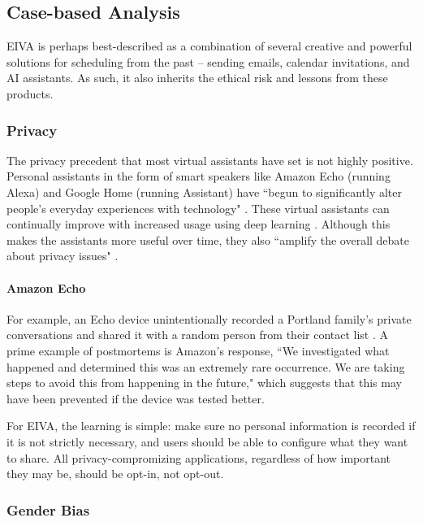 \documentclass{article}
\begin{document}
\subsection{Case-based Analysis}

EIVA is perhaps best-described as a combination of several creative and powerful solutions for scheduling from the past -- sending emails, calendar invitations, and AI assistants. As such, it also inherits the ethical risk and lessons from these products.

\subsubsection{Privacy}

The privacy precedent that most virtual assistants have set is not highly positive. Personal assistants in the form of smart speakers like Amazon Echo (running Alexa) and Google Home (running Assistant) have ``begun to significantly alter people’s everyday experiences with technology" \cite{pridmore_personal_2020}. These virtual assistants can continually improve with increased usage using deep learning \cite{kepuska_next-generation_2018}. Although this makes the assistants more useful over time, they also ``amplify the overall debate about privacy issues" \cite{zeng_end_2017}.

\paragraph{Amazon Echo}

For example, an Echo device unintentionally recorded a Portland family's private conversations and shared it with a random person from their contact list \cite{noauthor_this_nodate}. A prime example of postmortems is Amazon's response, ``We investigated what happened and determined this was an extremely rare occurrence. We are taking steps to avoid this from happening in the future," which suggests that this may have been prevented if the device was tested better.

For EIVA, the learning is simple: make sure no personal information is recorded if it is not strictly necessary, and users should be able to configure what they want to share. All privacy-compromizing applications, regardless of how important they may be, should be opt-in, not opt-out.

\subsubsection{Gender Bias}
\end{document}
